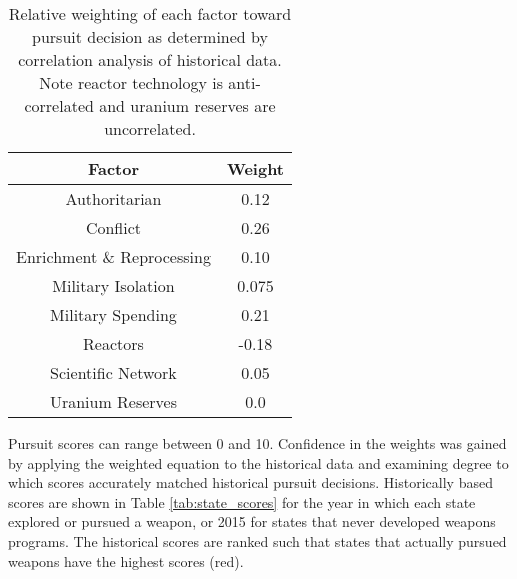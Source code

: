 \begin{table}
\centering
\begin{tabular}{|c|c|}
\hline
\textbf{Factor}        & \textbf{Weight} \\
\hline
Authoritarian   & 0.12 \\
Conflict  & 0.26 \\
Enrichment \& Reprocessing & 0.10 \\
Military Isolation & 0.075 \\
Military Spending & 0.21 \\
Reactors           & -0.18 \\
Scientific Network & 0.05 \\
Uranium Reserves &  0.0 \\
\hline
\end{tabular}
\caption{Relative weighting of each factor toward pursuit decision as determined by correlation analysis of historical data. Note reactor technology is anti-correlated and uranium reserves are uncorrelated.}
\label{tab:factor_weights}
\end{table}

Pursuit scores can range between 0 and 10.  Confidence in the weights was gained by applying the weighted equation to the historical data and examining degree to which scores accurately matched historical pursuit decisions.  Historically based scores are shown in Table \ref{tab:state_scores} for the year in which each state explored or pursued a weapon, or 2015 for states that never developed weapons programs. The historical scores are ranked such that states that actually pursued weapons have the highest scores (red).

